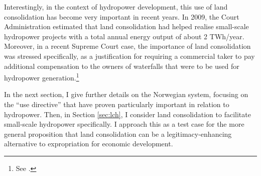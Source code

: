 Interestingly, in the context of hydropower development, this use of land consolidation has become very important in recent years. In 2009, the Court Administration estimated that land consolidation had helped realise small-scale hydropower projects with a total annual energy output of about 2 TWh/year. Moreover, in a recent Supreme Court case, the importance of land consolidation was stressed specifically, as a justification for requiring a commercial taker to pay additional compensation to the owners of waterfalls that were to be used for hydropower generation.\footnote{See \cite{klovtveit11}.}

In the next section, I give further details on the Norwegian system, focusing on the ``use directive'' that have proven particularly important in relation to hydropower. Then, in Section \ref{sec:lch}, I consider land consolidation to facilitate small-scale hydropower specifically. I approach this as a test case for the more general proposition that land consolidation can be a legitimacy-enhancing alternative to expropriation for  economic development.



